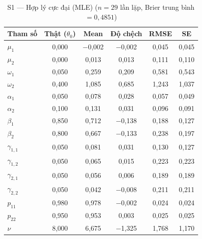 \documentclass[11pt,a4paper]{article}
\begin{document}
\begin{table}[H]\centering\scriptsize
\caption{S1 --- Hợp lý cực đại (MLE) ($n=29$ lần lặp, Brier trung bình $=0{,}4851$)}
\begin{tabularx}{\textwidth}{l C C C C C}
\toprule
\textbf{Tham số} & \textbf{Thật ($\theta_0$)} & \textbf{Mean} & \textbf{Độ chệch} & \textbf{RMSE} & \textbf{SE} \\
\midrule
$\mu_1$ & 0{,}000 & $-$0{,}002 & $-$0{,}002 & 0{,}045 & 0{,}045 \\
$\mu_2$ & 0{,}000 & 0{,}013 & 0{,}013 & 0{,}111 & 0{,}110 \\
$\omega_1$ & 0{,}050 & 0{,}259 & 0{,}209 & 0{,}581 & 0{,}543 \\
$\omega_2$ & 0{,}400 & 1{,}085 & 0{,}685 & 1{,}243 & 1{,}037 \\
$\alpha_1$ & 0{,}050 & 0{,}078 & 0{,}028 & 0{,}057 & 0{,}049 \\
$\alpha_2$ & 0{,}100 & 0{,}131 & 0{,}031 & 0{,}096 & 0{,}091 \\
$\beta_1$ & 0{,}850 & 0{,}712 & $-$0{,}138 & 0{,}188 & 0{,}127 \\
$\beta_2$ & 0{,}800 & 0{,}667 & $-$0{,}133 & 0{,}238 & 0{,}197 \\
$\gamma_{1,1}$ & 0{,}050 & 0{,}081 & 0{,}031 & 0{,}130 & 0{,}127 \\
$\gamma_{1,2}$ & 0{,}050 & 0{,}065 & 0{,}015 & 0{,}223 & 0{,}223 \\
$\gamma_{2,1}$ & 0{,}050 & 0{,}056 & 0{,}006 & 0{,}189 & 0{,}189 \\
$\gamma_{2,2}$ & 0{,}050 & 0{,}042 & $-$0{,}008 & 0{,}211 & 0{,}211 \\
$p_{11}$ & 0{,}980 & 0{,}978 & $-$0{,}002 & 0{,}024 & 0{,}024 \\
$p_{22}$ & 0{,}950 & 0{,}953 & 0{,}003 & 0{,}025 & 0{,}025 \\
$\nu$ & 8{,}000 & 6{,}675 & $-$1{,}325 & 1{,}768 & 1{,}170 \\
\bottomrule
\end{tabularx}
\end{table}
\end{document}
